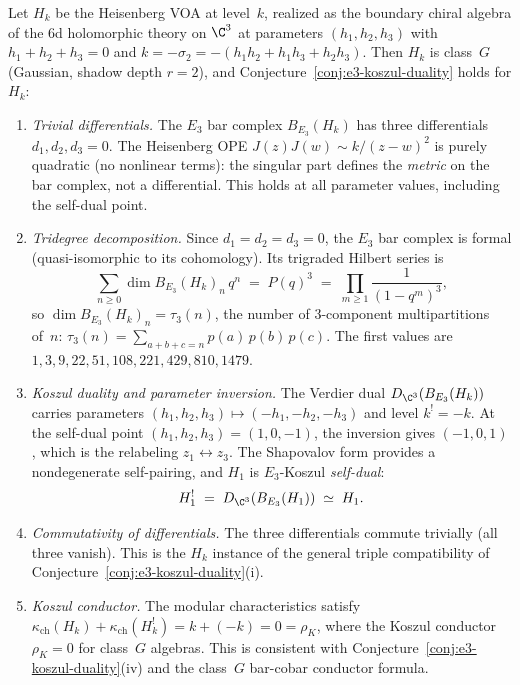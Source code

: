 \begin{theorem}
\label{thm:e3-koszul-heisenberg}
Let $H_k$ be the Heisenberg VOA at level~$k$, realized as the boundary chiral algebra of the 6d holomorphic theory on $\C^3$ at parameters $(h_1, h_2, h_3)$ with $h_1 + h_2 + h_3 = 0$ and $k = -\sigma_2 = -(h_1 h_2 + h_1 h_3 + h_2 h_3)$. Then $H_k$ is class~$G$ (Gaussian, shadow depth $r = 2$), and Conjecture~\ref{conj:e3-koszul-duality} holds for $H_k$:
\begin{enumerate}[label=\textup{(\roman*)}]
 \item \emph{Trivial differentials.} The $E_3$ bar complex $B_{E_3}(H_k)$ has three differentials $d_1, d_2, d_3 = 0$. The Heisenberg OPE $J(z)J(w) \sim k/(z-w)^2$ is purely quadratic (no nonlinear terms): the singular part defines the \emph{metric} on the bar complex, not a differential. This holds at all parameter values, including the self-dual point.

 \item \emph{Tridegree decomposition.} Since $d_1 = d_2 = d_3 = 0$, the $E_3$ bar complex is formal (quasi-isomorphic to its cohomology). Its trigraded Hilbert series is
 \[
 \sum_{n \geq 0} \dim B_{E_3}(H_k)_n \, q^n \;=\; P(q)^3 \;=\; \prod_{m \geq 1} \frac{1}{(1-q^m)^3},
 \]
 so $\dim B_{E_3}(H_k)_n = \tau_3(n)$, the number of $3$-component multipartitions of~$n$: $\tau_3(n) = \sum_{a+b+c=n} p(a)\,p(b)\,p(c)$. The first values are $1, 3, 9, 22, 51, 108, 221, 429, 810, 1479$.

 \item \emph{Koszul duality and parameter inversion.} The Verdier dual $D_{\C^3}(B_{E_3}(H_k))$ carries parameters $(h_1, h_2, h_3) \mapsto (-h_1, -h_2, -h_3)$ and level $k^! = -k$. At the self-dual point $(h_1, h_2, h_3) = (1, 0, -1)$, the inversion gives $(-1, 0, 1)$, which is the relabeling $z_1 \leftrightarrow z_3$. The Shapovalov form provides a nondegenerate self-pairing, and $H_1$ is $E_3$-Koszul \emph{self-dual}:
 \[
 H_1^! \;=\; D_{\C^3}(B_{E_3}(H_1)) \;\simeq\; H_1.
 \]

 \item \emph{Commutativity of differentials.} The three differentials commute trivially (all three vanish). This is the $H_k$ instance of the general triple compatibility of Conjecture~\ref{conj:e3-koszul-duality}(i).

 \item \emph{Koszul conductor.} The modular characteristics satisfy $\kappa_{\mathrm{ch}}(H_k) + \kappa_{\mathrm{ch}}(H_k^!) = k + (-k) = 0 = \rho_K$, where the Koszul conductor $\rho_K = 0$ for class~$G$ algebras. This is consistent with Conjecture~\ref{conj:e3-koszul-duality}(iv) and the class~$G$ bar-cobar conductor formula.
\end{enumerate}
\end{theorem}

